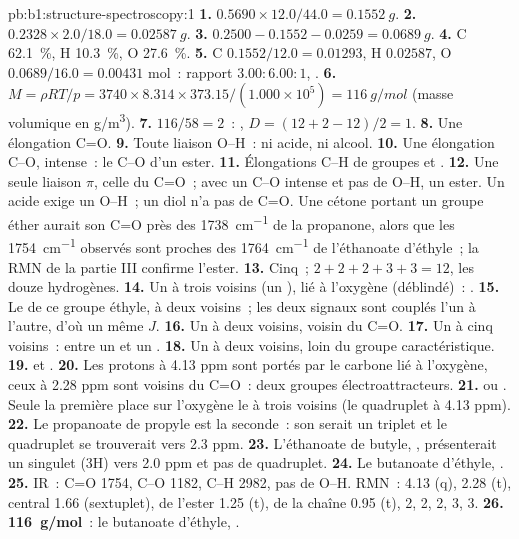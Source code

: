 \begin{solution}{pb:b1:structure-spectroscopy:1}
\textbf{1.} $0.5690 \times 12.0/44.0 = \qty{0.1552}{g}$.
\textbf{2.} $0.2328 \times 2.0/18.0 = \qty{0.02587}{g}$.
\textbf{3.} $0.2500 - 0.1552 - 0.0259 = \qty{0.0689}{g}$.
\textbf{4.} C \qty{62.1}{\percent}, H \qty{10.3}{\percent}, O
\qty{27.6}{\percent}.
\textbf{5.} C $0.1552/12.0 = 0.01293$, H $0.02587$, O $0.0689/16.0 =
0.00431$ mol~: rapport $3.00 : 6.00 : 1$, .
\textbf{6.} $M = \rho RT/p = 3740 \times 8.314 \times 373.15/(1.000 \times 10^5) =
\qty{116}{g/mol}$ (masse volumique en \unit{g/m^3}).
\textbf{7.} $116/58 = 2$~: , $D = (12 + 2 - 12)/2 = 1$.
\textbf{8.} Une élongation C=O.
\textbf{9.} Toute liaison O--H~: ni acide, ni alcool.
\textbf{10.} Une élongation C--O, intense~: le C--O d'un ester.
\textbf{11.} Élongations C--H de groupes  et .
\textbf{12.} Une seule liaison $\pi$, celle du C=O~; avec un C--O intense
et pas de O--H, un ester. Un acide exige un O--H~; un diol n'a pas de
C=O. Une cétone portant un groupe éther aurait son C=O près des
\qty{1738}{cm^{-1}} de la propanone, alors que les \qty{1754}{cm^{-1}}
observés sont proches des \qty{1764}{cm^{-1}} de l'éthanoate d'éthyle~;
la RMN de la partie III confirme l'ester.
\textbf{13.} Cinq~; $2 + 2 + 2 + 3 + 3 = 12$, les douze hydrogènes.
\textbf{14.} Un  à trois voisins (un ), lié à l'oxygène
(déblindé)~: .
\textbf{15.} Le  de ce groupe éthyle, à deux voisins~; les deux
signaux sont couplés l'un à l'autre, d'où un même $J$.
\textbf{16.} Un  à deux voisins, voisin du C=O.
\textbf{17.} Un  à cinq voisins~: entre un  et un
.
\textbf{18.} Un  à deux voisins, loin du groupe caractéristique.
\textbf{19.}  et .
\textbf{20.} Les protons à 4.13 ppm sont portés par le carbone lié à
l'oxygène, ceux à 2.28 ppm sont voisins du C=O~: deux groupes
électroattracteurs.
\textbf{21.}  ou .
Seule la première place sur l'oxygène le  à trois voisins (le
quadruplet à 4.13 ppm).
\textbf{22.} Le propanoate de propyle est la seconde~: son 
serait un triplet et le quadruplet se trouverait vers 2.3 ppm.
\textbf{23.} L'éthanoate de butyle, , présenterait un
singulet (3H) vers 2.0 ppm et pas de quadruplet.
\textbf{24.} Le butanoate d'éthyle, .
\textbf{25.} IR~: C=O 1754, C--O 1182, C--H 2982, pas de O--H. RMN~:
 4.13 (q),  2.28 (t),  central 1.66
(sextuplet),  de l'ester 1.25 (t),  de la chaîne
0.95 (t),  2, 2, 2, 3, 3.
\textbf{26.} \textbf{\qty{116}{g/mol}}~: le butanoate d'éthyle,
.
\end{solution}
